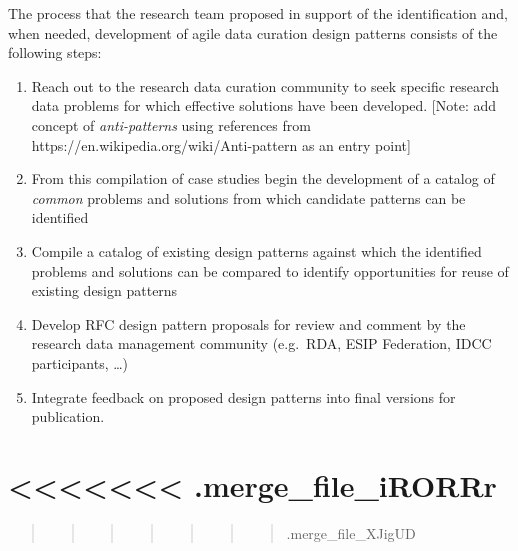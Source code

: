 \documentclass[paper]{ijdc-v9}
\begin{document}
The process that the research team proposed in support of the
identification and, when needed, development of agile data curation
design patterns consists of the following steps:

\begin{enumerate}
\def\labelenumi{\arabic{enumi}.}
\itemsep1pt\parskip0pt
\item
  Reach out to the research data curation community to seek specific
  research data problems for which effective solutions have been
  developed. {[}Note: add concept of \emph{anti-patterns} using
  references from https://en.wikipedia.org/wiki/Anti-pattern as an entry
  point{]}
\item
  From this compilation of case studies begin the development of a
  catalog of \emph{common} problems and solutions from which candidate
  patterns can be identified
\item
  Compile a catalog of existing design patterns against which the
  identified problems and solutions can be compared to identify
  opportunities for reuse of existing design patterns
\item
  Develop RFC design pattern proposals for review and comment by the
  research data management community (e.g.~RDA, ESIP Federation, IDCC
  participants, \ldots{})
\item
  Integrate feedback on proposed design patterns into final versions for
  publication.
\end{enumerate}

\section{\textless{}\textless{}\textless{}\textless{}\textless{}\textless{}\textless{}
.merge\_file\_iRORRr}\label{mergeux5ffileux5firorrr}

\begin{quote}
\begin{quote}
\begin{quote}
\begin{quote}
\begin{quote}
\begin{quote}
\begin{quote}
.merge\_file\_XJigUD
\end{quote}
\end{quote}
\end{quote}
\end{quote}
\end{quote}
\end{quote}
\end{quote}
\end{document}
